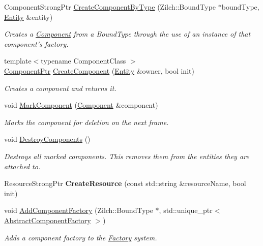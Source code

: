 \begin{DoxyCompactItemize}
Component\-Strong\-Ptr \hyperlink{classDCEngine_1_1Systems_1_1Factory_a171fdb103300147c65a630c56a90e2c4}{Create\-Component\-By\-Type} (Zilch\-::\-Bound\-Type $\ast$bound\-Type, \hyperlink{classDCEngine_1_1Entity}{Entity} \&entity)
\begin{DoxyCompactList}\small\item\em Creates a \hyperlink{classDCEngine_1_1Component}{Component} from a Bound\-Type through the use of an instance of that component's factory. \end{DoxyCompactList}\item 
{\footnotesize template$<$typename Component\-Class $>$ }\\\hyperlink{classDCEngine_1_1Component}{Component\-Ptr} \hyperlink{classDCEngine_1_1Systems_1_1Factory_aa01437192debb3aecadbd13ac72720bb}{Create\-Component} (\hyperlink{classDCEngine_1_1Entity}{Entity} \&owner, bool init)
\begin{DoxyCompactList}\small\item\em Creates a component and returns it. \end{DoxyCompactList}\item 
void \hyperlink{classDCEngine_1_1Systems_1_1Factory_a579fd600e622509e1f1e7e8bd6bb46ba}{Mark\-Component} (\hyperlink{classDCEngine_1_1Component}{Component} \&component)
\begin{DoxyCompactList}\small\item\em Marks the component for deletion on the next frame. \end{DoxyCompactList}\item 
void \hyperlink{classDCEngine_1_1Systems_1_1Factory_a776cd6cdc54459b710a07d16acd9872f}{Destroy\-Components} ()
\begin{DoxyCompactList}\small\item\em Destroys all marked components. This removes them from the entities they are attached to. \end{DoxyCompactList}\item 
\hypertarget{classDCEngine_1_1Systems_1_1Factory_a1216b79d2a0f6aa412175c9839a497ac}{Resource\-Strong\-Ptr {\bfseries Create\-Resource} (const std\-::string \&resource\-Name, bool init)}\label{classDCEngine_1_1Systems_1_1Factory_a1216b79d2a0f6aa412175c9839a497ac}

\item 
void \hyperlink{classDCEngine_1_1Systems_1_1Factory_ae7d84fb37d278aa315a76b2798a44347}{Add\-Component\-Factory} (Zilch\-::\-Bound\-Type $\ast$, std\-::unique\-\_\-ptr$<$ \hyperlink{classDCEngine_1_1Systems_1_1AbstractComponentFactory}{Abstract\-Component\-Factory} $>$)
\begin{DoxyCompactList}\small\item\em Adds a component factory to the \hyperlink{classDCEngine_1_1Systems_1_1Factory}{Factory} system. \end{DoxyCompactList}\end{DoxyCompactItemize}
